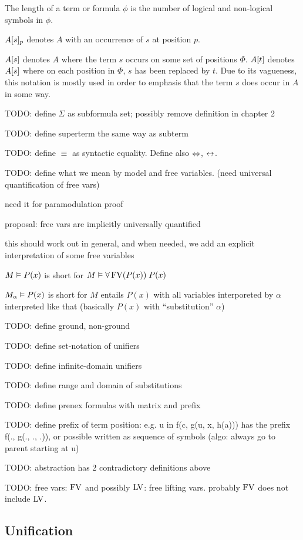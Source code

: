 The length of a term or formula $\phi$ is the number of logical and non-logical symbols in $\phi$.

$A{[s]_{p}}$ denotes $A$ with an occurrence of $s$ at position $p$.

$A[s]$ denotes $A$ where the term $s$ occurs on some set of positions $\Phi$. $A[t]$ denotes $A[s]$ where on each position in $\Phi$, $s$ has been replaced by $t$. Due to its vagueness, this notation is mostly used in order to emphasis that the term $s$ does occur in $A$ in some way.

TODO: define $\Sigma$ as subformula set; possibly remove definition in chapter 2

TODO: define superterm the same way as subterm

TODO: define $\equiv$ as syntactic equality. Define also $\operatorname{\Leftrightarrow}$, $\operatorname{\leftrightarrow}$.

TODO: define what we mean by model and free variables.
(need universal quantification of free vars)

need it for paramodulation proof

proposal: free vars are implicitly universally quantified

this should work out in general, and when needed, we add an explicit interpretation of some free variables

$M \vDash P(x)$ is short for $M \vDash \forall \operatorname{FV}(P(x))\;P(x)$

$M_\alpha \vDash P(x)$ is short for $M$ entails $P(x)$ with all variables interporeted by $\alpha$ interpreted like that (basically $P(x)$ with ``substitution'' $\alpha$)

TODO: define ground, non-ground

TODO: define set-notation of unifiers

TODO: define infinite-domain unifiers

TODO: define range and domain of substitutions

TODO: define prenex formulas with matrix and prefix

TODO: define prefix of term position: e.g. u in f(c, g(u, x, h(a))) has the prefix f(., g(., ., .)), or possible written as sequence of symbols (algo: always go to parent starting at u)

TODO: abstraction has 2 contradictory definitions above

TODO: free vars: $\operatorname{FV}$ and possibly $\operatorname{LV}$: free lifting vars. probably $\operatorname{FV}$ does not include $\operatorname{LV}$.


\subsection{Unification}

